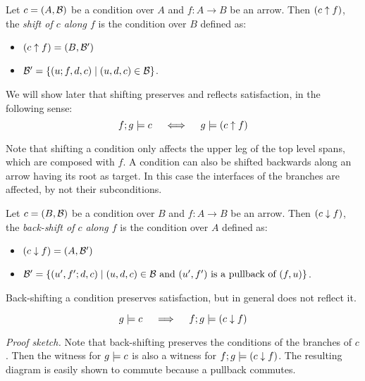 \begin{definition}
    Let $c = (A,\mathcal{B})$ be a condition over $A$ and $f: A \to B$ be an arrow. Then $(c\uparrow f)$, the \emph{shift of $c$ along $f$} is the condition over $B$ defined as:
    \begin{itemize}
        \item $(c\uparrow f) = (B, \mathcal{B}')$
        \item $\mathcal{B}' = \{(u;f,d,c) \mid (u,d,c) \in \mathcal{B}\}$.
     \end{itemize}
\end{definition}
We will show later that shifting preserves and reflects satisfaction, in the following sense: 
\begin{equation}
    \label{eq:shiftPresReflSat}
    f;g \models c \quad \iff\quad  g \models (c\uparrow f)
\end{equation} 

Note that shifting a condition only affects the upper leg of the top level spans, which are composed with $f$. A condition can also be shifted backwards along an arrow having its root as target. In this case the interfaces of the branches are affected, by not their subconditions.  

\begin{definition}
    Let $c = (B,\mathcal{B})$ be a condition over $B$ and $f: A \to B$ be an arrow. Then $(c\downarrow f)$, the \emph{back-shift of $c$ along $f$} is the condition over $A$ defined as:
    \begin{itemize}
        \item $(c\downarrow f) = (A, \mathcal{B}')$
        \item $\mathcal{B}' = \{(u',f';d,c) \mid (u,d,c) \in \mathcal{B} \mbox{ and } (u',f') \mbox{ is a pullback of } (f,u)\}$.
     \end{itemize}
\end{definition}

Back-shifting a condition preserves satisfaction, but in general does not reflect it.

\begin{proposition}
\begin{equation}
    g \models c \quad \implies \quad f;g \models (c\downarrow f)
\end{equation}    
\end{proposition} 
\emph{Proof sketch.} Note that back-shifting preserves the conditions of the branches of $c$. Then the witness for $g \models c$ is also a witness for $f;g \models (c\downarrow f)$. The resulting diagram is easily shown to commute because a pullback commutes.

